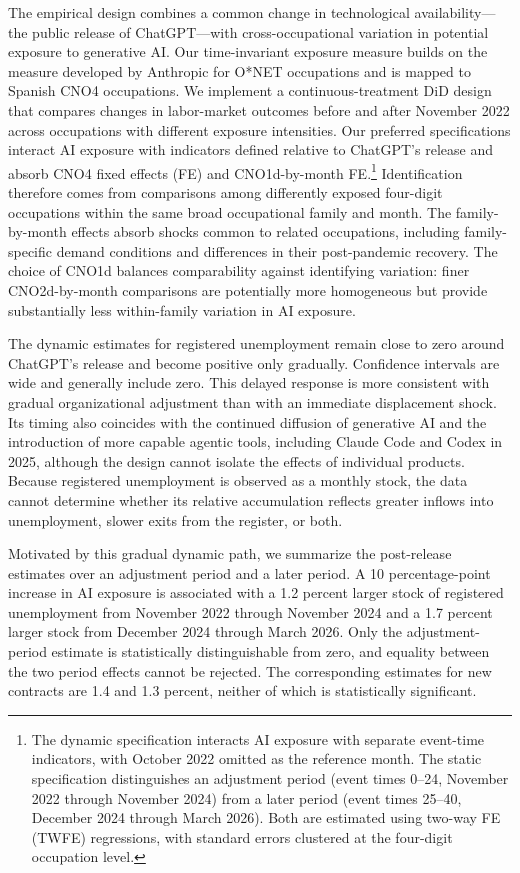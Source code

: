The empirical design combines a common change in technological availability---the public release of ChatGPT---with cross-occupational variation in potential exposure to generative AI. Our time-invariant exposure measure builds on the measure developed by Anthropic for O*NET occupations \citep{massenkoff_mccrory_2026} and is mapped to Spanish CNO4 occupations. We implement a continuous-treatment DiD design that compares changes in labor-market outcomes before and after November 2022 across occupations with different exposure intensities. Our preferred specifications interact AI exposure with indicators defined relative to ChatGPT's release and absorb CNO4 fixed effects (FE) and CNO1d-by-month FE.\footnote{The dynamic specification interacts AI exposure with separate event-time indicators, with October 2022 omitted as the reference month. The static specification distinguishes an adjustment period (event times 0--24, November 2022 through November 2024) from a later period (event times 25--40, December 2024 through March 2026). Both are estimated using two-way FE (TWFE) regressions, with standard errors clustered at the four-digit occupation level.} Identification therefore comes from comparisons among differently exposed four-digit occupations within the same broad occupational family and month. The family-by-month effects absorb shocks common to related occupations, including family-specific demand conditions and differences in their post-pandemic recovery. The choice of CNO1d balances comparability against identifying variation: finer CNO2d-by-month comparisons are potentially more homogeneous but provide substantially less within-family variation in AI exposure.

The dynamic estimates for registered unemployment remain close to zero around ChatGPT's release and become positive only gradually. Confidence intervals are wide and generally include zero. This delayed response is more consistent with gradual organizational adjustment than with an immediate displacement shock. Its timing also coincides with the continued diffusion of generative AI and the introduction of more capable agentic tools, including Claude Code and Codex in 2025, although the design cannot isolate the effects of individual products. Because registered unemployment is observed as a monthly stock, the data cannot determine whether its relative accumulation reflects greater inflows into unemployment, slower exits from the register, or both.

Motivated by this gradual dynamic path, we summarize the post-release estimates over an adjustment period and a later period. A 10 percentage-point increase in AI exposure is associated with a 1.2 percent larger stock of registered unemployment from November 2022 through November 2024 and a 1.7 percent larger stock from December 2024 through March 2026. Only the adjustment-period estimate is statistically distinguishable from zero, and equality between the two period effects cannot be rejected. The corresponding estimates for new contracts are 1.4 and 1.3 percent, neither of which is statistically significant.

